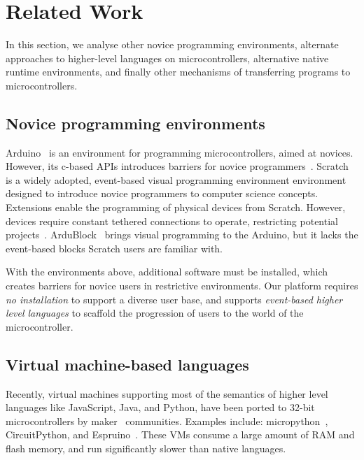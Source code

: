 \section{Related Work}
\label{sec:related}
In this section, we analyse other novice programming environments, alternate approaches to higher-level languages on microcontrollers, alternative native runtime environments, and finally other mechanisms of transferring programs to microcontrollers.

\subsection{Novice programming environments}

Arduino~\cite{buildingArduino2014} is an environment for programming microcontrollers, aimed at novices. However, its c-based APIs introduces barriers for novice programmers~\cite{blikstein2013gears}. Scratch~\cite{ScratchCACM2009} is a widely adopted, event-based visual programming environment environment designed to introduce novice programmers to computer science concepts. Extensions enable the programming of physical devices from Scratch. However, devices require constant tethered connections to operate, restricting potential projects~\cite{dougherty2012maker}. ArduBlock~\cite{Ardubloc28:online} brings visual programming to the Arduino, but it lacks the event-based blocks Scratch users are familiar with.

With the environments above, additional software must be installed, which creates barriers for novice users in restrictive environments. Our platform requires \emph{no installation} to support a diverse user base, and supports \emph{event-based higher level languages} to scaffold the progression of users to the world of the microcontroller.

\subsection{Virtual machine-based languages}

Recently, virtual machines supporting most of the semantics of higher level languages like JavaScript, Java, and Python, have been ported to 32-bit microcontrollers by maker~\cite{dougherty2012maker} communities. Examples include: micropython~\cite{MicroPython}, CircuitPython, and Espruino~\cite{espruinoBook}. These VMs consume a large amount of RAM and flash memory, and run significantly slower than native languages.

